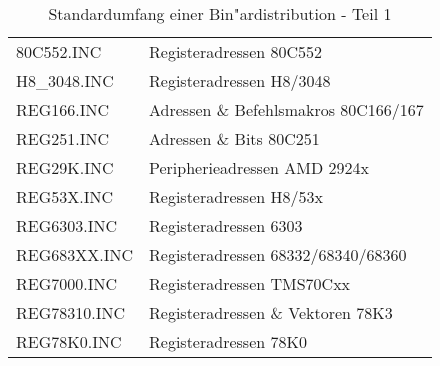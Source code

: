 \documentclass[12pt,a4paper,twoside]{report}
\begin{document}
\begin{table*}[htp]
\begin{center}
\begin{tabular}{|l|l|}
80C552.INC        & Registeradressen 80C552 \\
H8\_3048.INC      & Registeradressen H8/3048 \\
REG166.INC        & Adressen \& Befehlsmakros 80C166/167 \\
REG251.INC        & Adressen \& Bits 80C251 \\
REG29K.INC        & Peripherieadressen AMD 2924x \\
REG53X.INC        & Registeradressen H8/53x \\
REG6303.INC       & Registeradressen 6303 \\
REG683XX.INC      & Registeradressen 68332/68340/68360 \\
REG7000.INC       & Registeradressen TMS70Cxx \\
REG78310.INC      & Registeradressen \& Vektoren 78K3 \\
REG78K0.INC       & Registeradressen 78K0 \\
\hline
\end{tabular}\end{center}
\caption{Standardumfang einer Bin"ardistribution - Teil 1
         \label{TabCommonPackageList1}}
\end{table*}
\end{document}
